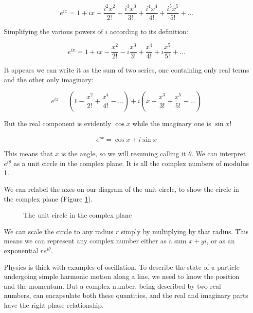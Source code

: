 $$
e^{ix} = 1 + ix + \frac{i^2x^2}{2!} + \frac{i^3x^3}{3!} + \frac{i^4x^4}{4!} + \frac{i^5x^5}{5!} + \ldots
$$

Simplifying the various powers of $i$ according to its definition:

$$
e^{ix} = 1 + ix - \frac{x^2}{2!} - i\frac{x^3}{3!} + \frac{x^4}{4!} + i\frac{x^5}{5!} + \ldots
$$

It appears we can write it as the sum of two series, one containing only real terms and the other only imaginary:

$$
e^{ix} = (1 - \frac{x^2}{2!} + \frac{x^4}{4!} - \ldots) + i(x - \frac{x^3}{3!} + \frac{x^5}{5!} - \ldots)
$$

But the real component is evidently $\cos x$ while the imaginary one is $\sin x$!

$$
e^{ix} = \cos x + i\sin x
$$

This means that $x$ is the angle, so we will resuming calling it $\theta$. We can interpret $e^{i\theta}$ as a unit circle in the complex plane. It is all the complex numbers of modulus 1.

We can relabel the axes on our diagram of the unit circle, to show the circle in the complex plane (Figure \ref{fig:unit-circle-complex}).

\begin{figure}[h]
    \centering
    \caption{The unit circle in the complex plane} \label{fig:unit-circle-complex}
\end{figure}

We can scale the circle to any radius $r$ simply by multiplying by that radius. This means we can represent any complex number either as a sum $x + yi$, or as an exponential $re^{i\theta}$.

Physics is thick with examples of oscillation. To describe the state of a particle undergoing simple harmonic motion along a line, we need to know the position and the momentum. But a complex number, being described by two real numbers, can encapsulate both these quantities, and the real and imaginary parts have the right phase relationship.

